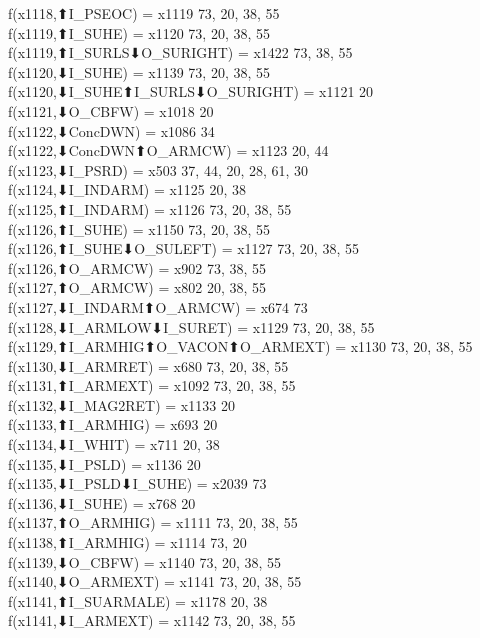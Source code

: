f(x1118,⬆I_PSEOC) = x1119 {73, 20, 38, 55} \\
f(x1119,⬆I_SUHE) = x1120 {73, 20, 38, 55} \\
f(x1119,⬆I_SURLS⬇O_SURIGHT) = x1422 {73, 38, 55} \\
f(x1120,⬇I_SUHE) = x1139 {73, 20, 38, 55} \\
f(x1120,⬇I_SUHE⬆I_SURLS⬇O_SURIGHT) = x1121 {20} \\
f(x1121,⬇O_CBFW) = x1018 {20} \\
f(x1122,⬇ConcDWN) = x1086 {34} \\
f(x1122,⬇ConcDWN⬆O_ARMCW) = x1123 {20, 44} \\
f(x1123,⬇I_PSRD) = x503 {37, 44, 20, 28, 61, 30} \\
f(x1124,⬇I_INDARM) = x1125 {20, 38} \\
f(x1125,⬆I_INDARM) = x1126 {73, 20, 38, 55} \\
f(x1126,⬆I_SUHE) = x1150 {73, 20, 38, 55} \\
f(x1126,⬆I_SUHE⬇O_SULEFT) = x1127 {73, 20, 38, 55} \\
f(x1126,⬆O_ARMCW) = x902 {73, 38, 55} \\
f(x1127,⬆O_ARMCW) = x802 {20, 38, 55} \\
f(x1127,⬇I_INDARM⬆O_ARMCW) = x674 {73} \\
f(x1128,⬇I_ARMLOW⬇I_SURET) = x1129 {73, 20, 38, 55} \\
f(x1129,⬆I_ARMHIG⬆O_VACON⬆O_ARMEXT) = x1130 {73, 20, 38, 55} \\
f(x1130,⬇I_ARMRET) = x680 {73, 20, 38, 55} \\
f(x1131,⬆I_ARMEXT) = x1092 {73, 20, 38, 55} \\
f(x1132,⬇I_MAG2RET) = x1133 {20} \\
f(x1133,⬆I_ARMHIG) = x693 {20} \\
f(x1134,⬇I_WHIT) = x711 {20, 38} \\
f(x1135,⬇I_PSLD) = x1136 {20} \\
f(x1135,⬇I_PSLD⬇I_SUHE) = x2039 {73} \\
f(x1136,⬇I_SUHE) = x768 {20} \\
f(x1137,⬆O_ARMHIG) = x1111 {73, 20, 38, 55} \\
f(x1138,⬆I_ARMHIG) = x1114 {73, 20} \\
f(x1139,⬇O_CBFW) = x1140 {73, 20, 38, 55} \\
f(x1140,⬇O_ARMEXT) = x1141 {73, 20, 38, 55} \\
f(x1141,⬆I_SUARMALE) = x1178 {20, 38} \\
f(x1141,⬇I_ARMEXT) = x1142 {73, 20, 38, 55} \\
